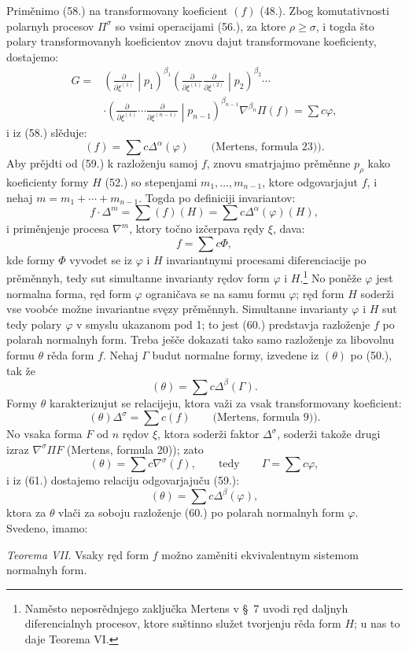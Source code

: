 \documentclass[11pt]{article}
\begin{document}
Priměnimo (58.) na transformovany koeficient $(f)$ (48.). Zbog komutativnosti polarnyh procesov $\Pi^\sigma$ so vsimi operacijami (56.), za ktore $\rho\ge\sigma$, i togda što polary transformovanyh koeficientov znovu dajut transformovane koeficienty, dostajemo:
\[
\begin{aligned}
G={}&\left(\frac{\partial}{\partial\xi^{(1)}}\middle|p_1\right)^{\beta_1}
\left(\frac{\partial}{\partial\xi^{(1)}}\frac{\partial}{\partial\xi^{(2)}}\middle|p_2\right)^{\beta_2}\cdots\\
&\cdot
\left(\frac{\partial}{\partial\xi^{(1)}}\cdots\frac{\partial}{\partial\xi^{(n-1)}}\middle|p_{n-1}\right)^{\beta_{n-1}}
\nabla^{\beta_n}\Pi(f)=\sum c\varphi,
\end{aligned}
\]
i iz (58.) slěduje:
\begin{equation}
 (f)=\sum c\Delta^\alpha(\varphi)\qquad\text{(Mertens, formula 23)).}
\tag{59}
\end{equation}
Aby prějdti od (59.) k razloženju samoj $f$, znovu smatrjajmo prěměnne $p_\rho$ kako koeficienty formy $H$ (52.) so stepenjami $m_1,\ldots,m_{n-1}$, ktore odgovarjajut $f$, i nehaj $m=m_1+\cdots+m_{n-1}$. Togda po definiciji invariantov:
\[
 f\cdot\Delta^m=\sum(f)(H)=\sum c\Delta^\alpha(\varphi)(H),
\]
i priměnjenje procesa $\nabla^m$, ktory točno izčerpava rędy $\xi$, dava:
\begin{equation}
 f=\sum c\Phi,
\tag{60}
\end{equation}
kde formy $\Phi$ vyvodet se iz $\varphi$ i $H$ invariantnymi procesami diferenciacije po prěměnnyh, tedy sut simultanne invarianty rędov form $\varphi$ i $H$.\footnote{Naměsto neposrědnjego zaključka Mertens v \S\ 7 uvodi ręd daljnyh diferencialnyh procesov, ktore suštinno služet tvorjenju rěda form $H$; u nas to daje Teorema VI.} No poněže $\varphi$ jest normalna forma, ręd form $\varphi$ ograničava se na samu formu $\varphi$; ręd form $H$ soderži vse voobće možne invariantne svęzy prěměnnyh. Simultanne invarianty $\varphi$ i $H$ sut tedy polary $\varphi$ v smyslu ukazanom pod 1; to jest (60.) predstavja razloženje $f$ po polarah normalnyh form. Treba ješče dokazati tako samo razloženje za libovolnu formu $\theta$ rěda form $f$. Nehaj $\Gamma$ budut normalne formy, izvedene iz $(\theta)$ po (50.), tak že
\begin{equation}
 (\theta)=\sum c\Delta^\beta(\Gamma).
\tag{61}
\end{equation}
Formy $\theta$ karakterizujut se relacijeju, ktora važi za vsak transformovany koeficient:
\[
 (\theta)\Delta^\sigma=\sum c(f)\qquad\text{(Mertens, formula 9)).}
\]
No vsaka forma $F$ od $n$ rędov $\xi$, ktora soderži faktor $\Delta^\sigma$, soderži takože drugi izraz $\nabla^\sigma\Pi F$ (Mertens, formula 20)); zato
\[
 (\theta)=\sum c\nabla^\sigma(f),\qquad\text{tedy}\qquad \Gamma=\sum c\varphi,
\]
i iz (61.) dostajemo relaciju odgovarjajuču (59.):
\[
 (\theta)=\sum c\Delta^\beta(\varphi),
\]
ktora za $\theta$ vlači za soboju razloženje (60.) po polarah normalnyh form $\varphi$. Svedeno, imamo:

\emph{Teorema VII.} Vsaky ręd form $f$ možno zaměniti ekvivalentnym sistemom normalnyh form.
\end{document}
